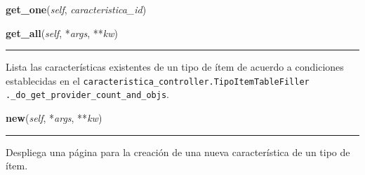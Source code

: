     \vspace{0.5ex}

\hspace{.8\funcindent}\begin{boxedminipage}{\funcwidth}

    \raggedright \textbf{get\_one}(\textit{self}, \textit{caracteristica\_id})

\setlength{\parskip}{2ex}
\setlength{\parskip}{1ex}
    \end{boxedminipage}

    \label{saip:controllers:caracteristica_controller:CaracteristicaController:get_all}

    \vspace{0.5ex}

\hspace{.8\funcindent}\begin{boxedminipage}{\funcwidth}

    \raggedright \textbf{get\_all}(\textit{self}, *\textit{args}, **\textit{kw})

    \vspace{-1.5ex}

    \rule{\textwidth}{0.5\fboxrule}
\setlength{\parskip}{2ex}
    Lista las características existentes de un tipo de ítem de acuerdo a 
    condiciones establecidas en el 
    \texttt{caracteristica\_controller.TipoItemTableFiller 
    .\_do\_get\_provider\_count\_and\_objs}.

\setlength{\parskip}{1ex}
    \end{boxedminipage}

    \label{saip:controllers:caracteristica_controller:CaracteristicaController:new}

    \vspace{0.5ex}

\hspace{.8\funcindent}\begin{boxedminipage}{\funcwidth}

    \raggedright \textbf{new}(\textit{self}, *\textit{args}, **\textit{kw})

    \vspace{-1.5ex}

    \rule{\textwidth}{0.5\fboxrule}
\setlength{\parskip}{2ex}
    Despliega una página para la creación de una nueva característica de un
    tipo de ítem.

\setlength{\parskip}{1ex}
    \end{boxedminipage}

